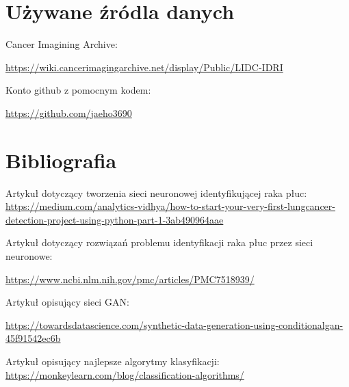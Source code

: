 \documentclass[10pt]{article}
\begin{document}
\section{Używane źródla danych}
Cancer Imagining Archive:

\href{https://wiki.cancerimagingarchive.net/display/Public/LIDC-IDRI}{https://wiki.cancerimagingarchive.net/display/Public/LIDC-IDRI}

Konto github z pomocnym kodem:

\href{https://github.com/jaeho3690}{https://github.com/jaeho3690}

\section{Bibliografia}
Artykuł dotyczący tworzenia sieci neuronowej identyfikującej raka płuc: \href{https://medium.com/analytics-vidhya/how-to-start-your-very-first-lungcancer-detection-project-using-python-part-1-3ab490964aae}{https://medium.com/analytics-vidhya/how-to-start-your-very-first-lungcancer-detection-project-using-python-part-1-3ab490964aae}

Artykuł dotyczący rozwiązań problemu identyfikacji raka płuc przez sieci neuronowe:

\href{https://www.ncbi.nlm.nih.gov/pmc/articles/PMC7518939/}{https://www.ncbi.nlm.nih.gov/pmc/articles/PMC7518939/}

Artykuł opisujący sieci GAN:

\href{https://towardsdatascience.com/synthetic-data-generation-using-conditionalgan-45f91542ec6b}{https://towardsdatascience.com/synthetic-data-generation-using-conditionalgan-45f91542ec6b}

Artykuł opisujący najlepsze algorytmy klasyfikacji: \href{https://monkeylearn.com/blog/classification-algorithms/}{https://monkeylearn.com/blog/classification-algorithms/}
\end{document}
